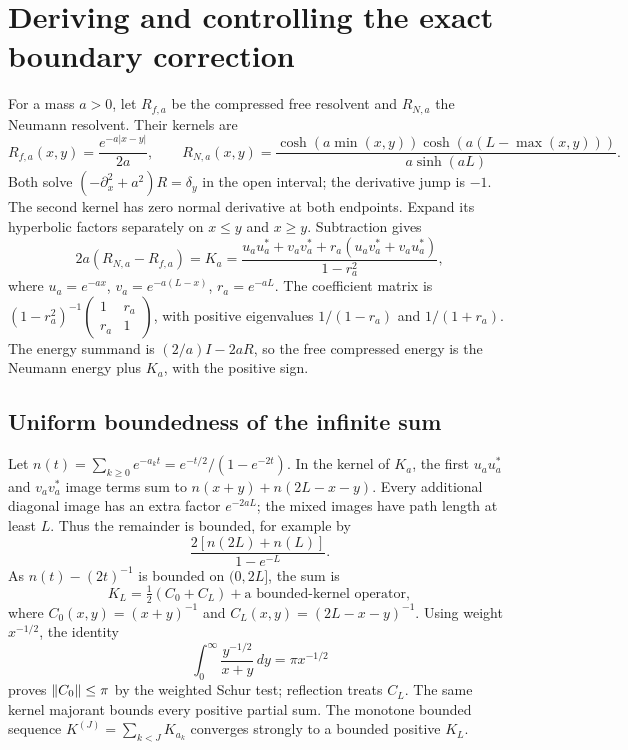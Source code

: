 \section{Deriving and controlling the exact boundary correction}
For a mass $a>0$, let $R_{f,a}$ be the compressed free resolvent and
$R_{N,a}$ the Neumann resolvent. Their kernels are
\[
R_{f,a}(x,y)=\frac{e^{-a|x-y|}}{2a},\qquad
R_{N,a}(x,y)=\frac{\cosh(a\min(x,y))\cosh(a(L-\max(x,y)))}{a\sinh(aL)}.
\]
Both solve $(-\partial_x^2+a^2)R=\delta_y$ in the open interval;
the derivative jump is $-1$. The second kernel has zero normal derivative
at both endpoints. Expand its hyperbolic factors separately on $x\le y$
and $x\ge y$. Subtraction gives
\begin{equation}\label{d:mass-boundary}
2a(R_{N,a}-R_{f,a})=K_a
=\frac{u_au_a^*+v_av_a^*+r_a(u_av_a^*+v_au_a^*)}{1-r_a^2},
\end{equation}
where $u_a=e^{-ax}$, $v_a=e^{-a(L-x)}$, $r_a=e^{-aL}$.
The coefficient matrix is $(1-r_a^2)^{-1}
\left(\begin{smallmatrix}1&r_a\\r_a&1\end{smallmatrix}\right)$, with
positive eigenvalues $1/(1-r_a)$ and $1/(1+r_a)$.
The energy summand is $(2/a)I-2aR$, so the free compressed energy is
the Neumann energy plus $K_a$, with the positive sign.

\subsection{Uniform boundedness of the infinite sum}
Let $n(t)=\sum_{k\ge0}e^{-a_kt}=e^{-t/2}/(1-e^{-2t})$. In the kernel
of $K_a$, the first $u_au_a^*$ and $v_av_a^*$ image terms sum to
$n(x+y)+n(2L-x-y)$. Every additional diagonal image has an extra
factor $e^{-2aL}$; the mixed images have path length at least $L$.
Thus the remainder is bounded, for example by
\[
\frac{2[n(2L)+n(L)]}{1-e^{-L}}.
\]
As $n(t)-(2t)^{-1}$ is bounded on $(0,2L]$, the sum is
\begin{equation}\label{d:Carleman}
K_L=\tfrac12(C_0+C_L)+\text{a bounded-kernel operator},
\end{equation}
where $C_0(x,y)=(x+y)^{-1}$ and $C_L(x,y)=(2L-x-y)^{-1}$.
Using weight $x^{-1/2}$, the identity
\[
\int_0^\infty\frac{y^{-1/2}}{x+y}\,dy=\pi x^{-1/2}
\]
proves $\lVert C_0\rVert\le\pi$ by the weighted Schur test; reflection treats
$C_L$. The same kernel majorant bounds every positive partial sum.
The monotone bounded sequence $K^{(J)}=\sum_{k<J}K_{a_k}$ converges strongly
to a bounded positive $K_L$.

